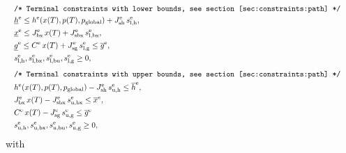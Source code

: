 \documentclass[english]{article}
\newcommand{\ind}[1]{_{\textrm{#1}}}
\newcommand{\terminal}{^{\textrm{e}}}
\newcommand{\glob}{_{\textrm{global}}}
\newcommand{\lowerh}{\ind{l,h}}
\newcommand{\lowerbx}{\ind{l,bx}}
\newcommand{\lowerbu}{\ind{l,bu}}
\newcommand{\lowerg}{\ind{l,g}}
\newcommand{\upperh}{\ind{u,h}}
\newcommand{\upperbx}{\ind{u,bx}}
\newcommand{\upperbu}{\ind{u,bu}}
\newcommand{\upperg}{\ind{u,g}}
\newcommand{\mathComment}[1]{\texttt{/* #1 */}}
\begin{document}
\begin{align}
    &&&\mathComment{Terminal constraints with lower bounds, see section \ref{sec:constraints:path}}\nonumber\\
    &&&\underline{h}\terminal \leq h\terminal(x(T), p(T), p\glob) + J\ind{sh}\terminal\, s\lowerh\terminal, &&\label{eq:constraints:terminal:lower_bounds:start}\\
    &&&\underline{x}\terminal \leq J_{\textrm{bx}}\terminal\, x(T) + J\ind{sbx}\terminal\, s\lowerbx\terminal, &&\\ %
    &&&\underline{g}\terminal \leq C\terminal\, x(T) + J\ind{sg}\terminal\, s\lowerg\terminal \leq \overline{g}\terminal, && \\
    &&& s\lowerh\terminal, s\lowerbx\terminal, s\lowerbu\terminal, s\lowerg\terminal \geq 0, \label{eq:constraints:terminal:lower_bounds:end}\\[1ex]
    &&&\mathComment{Terminal constraints with upper bounds, see section \ref{sec:constraints:path}}\nonumber\\
    &&& h\terminal(x(T), p(T), p\glob) - J\ind{sh}\terminal\, s\ind{u,h}\terminal \leq \overline{h}\terminal, &&\label{eq:constraints:terminal:upper_bounds:start}\\
    &&& J_{\textrm{bx}}\terminal\, x(T) - J\ind{sbx}\terminal\, s\ind{u,bx}\terminal \leq \overline{x}^{e}, &&\\
    &&& C\terminal\, x(T) - J\ind{sg}\terminal\, s\ind{u,g}\terminal \leq \overline{g}\terminal \\
    &&& s\upperh\terminal, s\upperbx\terminal, s\upperbu\terminal, s\upperg\terminal \geq 0,\label{eq:constraints:terminal:upper_bounds:end}
\end{align}
%
with
\end{document}
